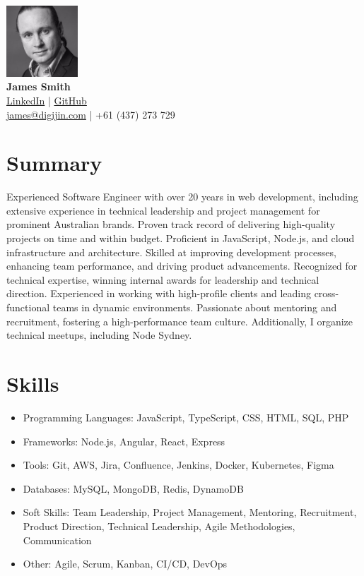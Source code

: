 \documentclass[a4paper,10pt]{article}
\begin{document}
\begin{center}
    \includegraphics[width=0.2\textwidth]{src/profile.jpg} \\ %
    {\Huge \textbf{James Smith}} \\
    \href{https://www.linkedin.com/in/digijin/}{LinkedIn} | \href{https://github.com/digijin}{GitHub} \\
    \href{mailto:james@digijin.com}{james@digijin.com} | +61 (437) 273 729
\end{center}

\section*{Summary}
Experienced Software Engineer with over 20 years in web development, including extensive experience in technical leadership and project management for prominent Australian brands. Proven track record of delivering high-quality projects on time and within budget. Proficient in JavaScript, Node.js, and cloud infrastructure and architecture. Skilled at improving development processes, enhancing team performance, and driving product advancements. Recognized for technical expertise, winning internal awards for leadership and technical direction. Experienced in working with high-profile clients and leading cross-functional teams in dynamic environments. Passionate about mentoring and recruitment, fostering a high-performance team culture. Additionally, I organize technical meetups, including Node Sydney.

\section*{Skills}
\begin{itemize}
    \item Programming Languages: JavaScript, TypeScript, CSS, HTML, SQL, PHP
    \item Frameworks: Node.js, Angular, React, Express
    \item Tools: Git, AWS, Jira, Confluence, Jenkins, Docker, Kubernetes, Figma
    \item Databases: MySQL, MongoDB, Redis, DynamoDB
    \item Soft Skills: Team Leadership, Project Management, Mentoring, Recruitment, Product Direction, Technical Leadership, Agile Methodologies, Communication
    \item Other: Agile, Scrum, Kanban, CI/CD, DevOps
\end{itemize}
\end{document}
